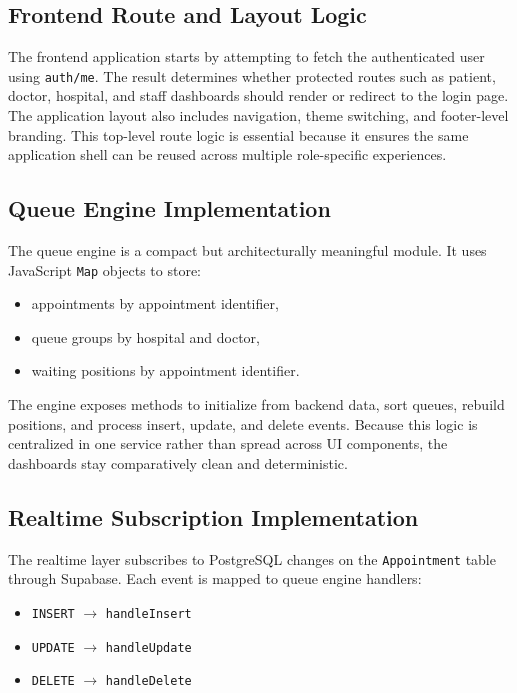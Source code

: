 \documentclass[12pt,onecolumn]{IEEEtran}
\begin{document}
\subsection{Frontend Route and Layout Logic}
The frontend application starts by attempting to fetch the authenticated user using \texttt{auth/me}. The result determines whether protected routes such as patient, doctor, hospital, and staff dashboards should render or redirect to the login page. The application layout also includes navigation, theme switching, and footer-level branding. This top-level route logic is essential because it ensures the same application shell can be reused across multiple role-specific experiences.

\subsection{Queue Engine Implementation}
The queue engine is a compact but architecturally meaningful module. It uses JavaScript \texttt{Map} objects to store:
\begin{itemize}
    \item appointments by appointment identifier,
    \item queue groups by hospital and doctor,
    \item waiting positions by appointment identifier.
\end{itemize}

The engine exposes methods to initialize from backend data, sort queues, rebuild positions, and process insert, update, and delete events. Because this logic is centralized in one service rather than spread across UI components, the dashboards stay comparatively clean and deterministic.

\subsection{Realtime Subscription Implementation}
The realtime layer subscribes to PostgreSQL changes on the \texttt{Appointment} table through Supabase. Each event is mapped to queue engine handlers:
\begin{itemize}
    \item \texttt{INSERT} $\rightarrow$ \texttt{handleInsert}
    \item \texttt{UPDATE} $\rightarrow$ \texttt{handleUpdate}
    \item \texttt{DELETE} $\rightarrow$ \texttt{handleDelete}
\end{itemize}
\end{document}
